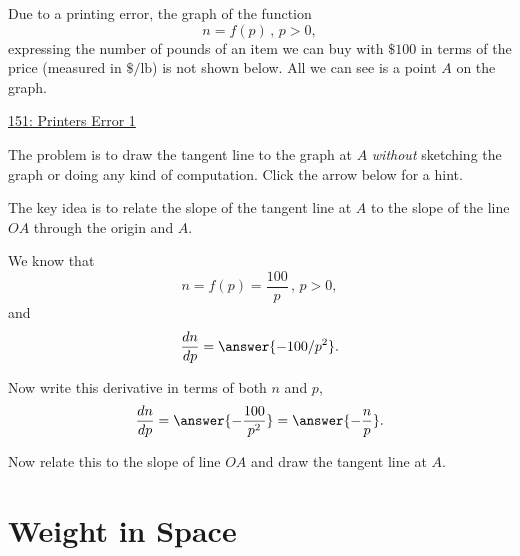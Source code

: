 \documentclass{ximera}
\begin{document}
\begin{question} \label{QGETGG3fg44}
Due to a printing error, the graph of the function
\[
      n = f(p)  \, , \, p>0 ,
\]
expressing the number of pounds of an item we can buy with $\$100$ in terms of the price (measured in $\$/\text{lb}$) is not shown below. All we can see is a point $A$ on the graph.

\begin{onlineOnly}
    \begin{center}
\end{center}
\end{onlineOnly}

\href{https://www.desmos.com/calculator/y5nqs8fkvj}{151: Printers Error 1}

The problem is to draw the tangent line to the graph at $A$ \emph{without} sketching the graph or doing any kind of computation. Click the arrow below for a hint.

\begin{expandable}
The key idea is to relate the slope of the tangent line at $A$ to the slope of the line $OA$ through the origin and $A$.


We know that
\[
      n = f(p)  = \frac{100}{p} \, , \, p>0 ,
\]
and
\[
 \frac{dn}{dp} =\answer{-100/p^2} .
\]

Now write this derivative in terms of both $n$ and $p$, 
\[
   \frac{dn}{dp} =\answer{-\frac{100}{p^2}} = \answer{-\frac{n}{p}} .
\]

Now relate this to the slope of line $OA$ and draw the tangent line at $A$.

\end{expandable}

\end{question}


\section{Weight in Space}
\end{document}
